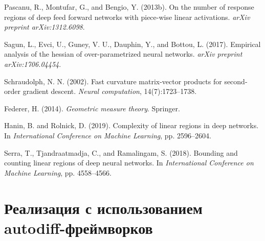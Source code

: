 \documentclass[11pt]{article}
\begin{document}
\begin{thebibliography}{10}
  Pascanu, R., Montufar, G., and Bengio, Y. (2013b).
  \newblock On the number of response regions of deep feed forward networks with piece-wise linear activations.
  \newblock \textit{arXiv preprint arXiv:1312.6098}.

  Sagun, L., Evci, U., Guney, V. U., Dauphin, Y., and Bottou, L. (2017).
  \newblock Empirical analysis of the hessian of over-parametrized neural networks.
  \newblock \textit{arXiv preprint arXiv:1706.04454}.

  Schraudolph, N. N. (2002).
  \newblock Fast curvature matrix-vector products for second-order gradient descent.
  \newblock \textit{Neural computation}, 14(7):1723--1738.

  Federer, H. (2014).
  \newblock \textit{Geometric measure theory}.
  \newblock Springer.

  Hanin, B. and Rolnick, D. (2019).
  \newblock Complexity of linear regions in deep networks.
  \newblock In \textit{International Conference on Machine Learning}, pp. 2596--2604.

  Serra, T., Tjandraatmadja, C., and Ramalingam, S. (2018).
  \newblock Bounding and counting linear regions of deep neural networks.
  \newblock In \textit{International Conference on Machine Learning}, pp. 4558--4566.
\end{thebibliography}

\appendix
\section{Реализация с использованием autodiff-фреймворков}
\end{document}
